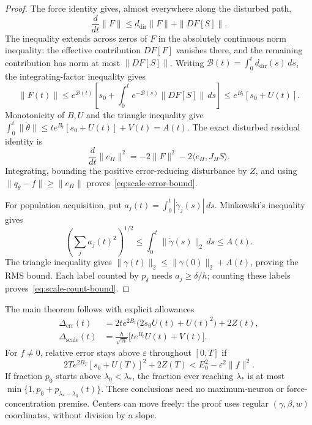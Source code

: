 \begin{proof}
The force identity gives, almost everywhere along the disturbed path,
\begin{equation}
\frac{d}{dt}\|F\|\le d_{\mathrm{dir}}\|F\|+\|DF[S]\|.
\end{equation}
The inequality extends across zeros of $F$ in the absolutely continuous
norm inequality: the effective contribution $DF[F]$ vanishes there, and
the remaining contribution has norm at most $\|DF[S]\|$.
Writing $\mathcal B(t)=\int_0^t d_{\mathrm{dir}}(s)\,ds$, the
integrating-factor inequality gives
\begin{equation}
\|F(t)\|\le e^{\mathcal B(t)}
\left[s_0+\int_0^t e^{-\mathcal B(s)}\|DF[S]\|\,ds\right]
\le e^{B_t}[s_0+U(t)].
\end{equation}
Monotonicity of $B,U$ and the triangle inequality give
$\int_0^t\|\dot\theta\|\le t e^{B_t}[s_0+U(t)]+V(t)=A(t)$.
The exact disturbed residual identity is
\begin{equation}
\frac{d}{dt}\|e_H\|^2=-2\|F\|^2-2\langle e_H,J_HS\rangle.
\end{equation}
Integrating, bounding the positive error-reducing disturbance by $Z$, and
using $\|q_\theta-f\|\ge\|e_H\|$ proves~\eqref{eq:scale-error-bound}.

For population acquisition, put $a_j(t)=\int_0^t|\dot\gamma_j(s)|\,ds$.
Minkowski's inequality gives
\begin{equation}
\left(\sum_j a_j(t)^2\right)^{1/2}
\le\int_0^t\|\dot\gamma(s)\|_2\,ds\le A(t).
\end{equation}
The triangle inequality gives
$\|\gamma(t)\|_2\le\|\gamma(0)\|_2+A(t)$, proving the RMS bound.
Each label counted by $p_\delta$ needs $a_j\ge\delta/h$; counting these
labels proves~\eqref{eq:scale-count-bound}.
\end{proof}

The main theorem follows with explicit allowances
\begin{equation}
\begin{aligned}
\Delta_{\mathrm{err}}(t)
&=2t e^{2B_t}\bigl(2s_0U(t)+U(t)^2\bigr)+2Z(t),\\
\Delta_{\mathrm{scale}}(t)
&=\frac{h}{\sqrt W}\bigl[t e^{B_t}U(t)+V(t)\bigr].
\end{aligned}
\label{eq:scale-allowances}
\end{equation}
For $f\ne0$, relative error stays above $\varepsilon$ throughout $[0,T]$
if
\begin{equation}
2T e^{2B_T}[s_0+U(T)]^2+2Z(T)
<E_0^2-\varepsilon^2\|f\|^2.
\label{eq:scale-accuracy-criterion}
\end{equation}
If fraction $p_0$ starts above $\lambda_0<\lambda_*$, the fraction ever
reaching $\lambda_*$ is at most
$\min\{1,p_0+p_{\lambda_*-\lambda_0}(t)\}$.
These conclusions need no maximum-neuron or force-concentration premise.
Centers can move freely: the proof uses regular $(\gamma,\beta,w)$
coordinates, without division by a slope.

